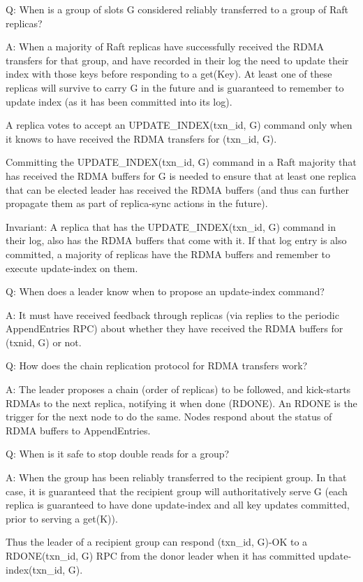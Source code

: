 Q: When is a group of slots G considered reliably transferred to a group of Raft replicas?

A: When a majority of Raft replicas have successfully received the RDMA transfers for that group, and have recorded in their log the need to update their index with those keys before responding to a get(Key). At least one of these replicas will survive to carry G in the future and is guaranteed to remember to update index (as it has been committed into its log).

A replica votes to accept an UPDATE\_INDEX(txn\_id, G) command only when it knows to have received the RDMA transfers for (txn\_id, G).

Committing the UPDATE\_INDEX(txn\_id, G) command in a Raft majority that has received the RDMA buffers for G is needed to ensure that at least one replica that can be elected leader has received the RDMA buffers (and thus can further propagate them as part of replica-sync actions in the future).

Invariant: A replica that has the UPDATE\_INDEX(txn\_id, G) command in their log, also has the RDMA buffers that come with it. If that log entry is also committed, a majority of replicas have the RDMA buffers and remember to execute update-index on them.

Q: When does a leader know when to propose an update-index command?

A: It must have received feedback through replicas (via replies to the periodic AppendEntries RPC) about whether they have received the RDMA buffers for (txnid, G) or not.

Q: How does the chain replication protocol for RDMA transfers work?

A: The leader proposes a chain (order of replicas) to be followed, and kick-starts RDMAs to the next replica, notifying it when done (RDONE). An RDONE is the trigger for the next node to do the same. Nodes respond about the status of RDMA buffers to AppendEntries.

Q: When is it safe to stop double reads for a group?

A: When the group has been reliably transferred to the recipient group. In that case, it is guaranteed that the recipient group will authoritatively serve G (each replica is guaranteed to have done update-index and all key updates committed, prior to serving a get(K)).

Thus the leader of a recipient group can respond (txn\_id, G)-OK to a RDONE(txn\_id, G) RPC from the donor leader when it has committed update-index(txn\_id, G).

